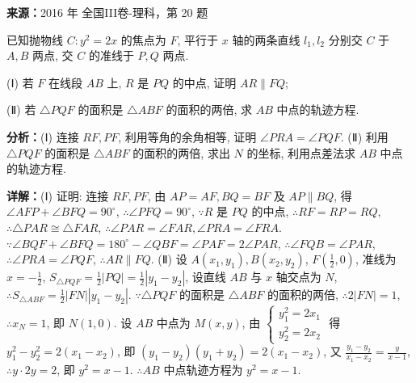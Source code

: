 \begin{question}[points=12]
\textbf{来源：}2016 年 全国III卷-理科，第 20 题\par
已知抛物线 $C:y^2=2x$ 的焦点为 $F$, 平行于 $x$ 轴的两条直线 $l_1,l_2$ 分别交 $C$ 于 $A,B$ 两点, 交 $C$ 的准线于 $P,Q$ 两点.

(Ⅰ) 若 $F$ 在线段 $AB$ 上, $R$ 是 $PQ$ 的中点, 证明 $AR\parallel FQ$;

(Ⅱ) 若 $\triangle PQF$ 的面积是 $\triangle ABF$ 的面积的两倍, 求 $AB$ 中点的轨迹方程.
\begin{solution}

\textbf{分析：}(Ⅰ) 连接 $RF,PF$, 利用等角的余角相等, 证明 $\angle PRA=\angle PQF$. (Ⅱ) 利用 $\triangle PQF$ 的面积是 $\triangle ABF$ 的面积的两倍, 求出 $N$ 的坐标, 利用点差法求 $AB$ 中点的轨迹方程.

\textbf{详解：}(Ⅰ) 证明: 连接 $RF,PF$, 由 $AP=AF,BQ=BF$ 及 $AP\parallel BQ$, 得 $\angle AFP+\angle BFQ=90^\circ$, $\therefore\angle PFQ=90^\circ$, $\because R$ 是 $PQ$ 的中点, $\therefore RF=RP=RQ$, $\therefore\triangle PAR\cong\triangle FAR$, $\therefore\angle PAR=\angle FAR,\angle PRA=\angle FRA$. $\because\angle BQF+\angle BFQ=180^\circ-\angle QBF=\angle PAF=2\angle PAR$, $\therefore\angle FQB=\angle PAR$, $\therefore\angle PRA=\angle PQF$, $\therefore AR\parallel FQ$.
(Ⅱ) 设 $A(x_1,y_1),B(x_2,y_2)$, $F(\frac{1}{2},0)$, 准线为 $x=-\frac{1}{2}$, $S_{\triangle PQF}=\frac{1}{2}|PQ|=\frac{1}{2}|y_1-y_2|$, 设直线 $AB$ 与 $x$ 轴交点为 $N$, $\therefore S_{\triangle ABF}=\frac{1}{2}|FN||y_1-y_2|$. $\because\triangle PQF$ 的面积是 $\triangle ABF$ 的面积的两倍, $\therefore 2|FN|=1$, $\therefore x_N=1$, 即 $N(1,0)$. 设 $AB$ 中点为 $M(x,y)$, 由 $\begin{cases}y_1^2=2x_1\\y_2^2=2x_2\end{cases}$ 得 $y_1^2-y_2^2=2(x_1-x_2)$, 即 $(y_1-y_2)(y_1+y_2)=2(x_1-x_2)$, 又 $\frac{y_1-y_2}{x_1-x_2}=\frac{y}{x-1}$, $\therefore y\cdot2y=2$, 即 $y^2=x-1$. $\therefore AB$ 中点轨迹方程为 $y^2=x-1$.
\end{solution}
\end{question}

